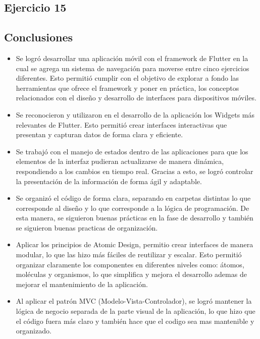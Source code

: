 \documentclass[12pt,letterpaper]{article}
\begin{document}
\subsection{Ejercicio 15}



\subsection{Conclusiones}

\begin{itemize}
    \item Se logró desarrollar una aplicación móvil con el framework de Flutter en la cual se agrega un sistema de navegación para moverse entre cinco ejercicios diferentes. Esto permitió cumplir con el objetivo de explorar a fondo las herramientas que ofrece el framework y poner en práctica, los conceptos relacionados con el diseño y desarrollo de interfaces para dispositivos móviles.
    \item Se reconocieron y utilizaron en el desarrollo de la aplicación los Widgets más relevantes de Flutter. Esto permitió crear interfaces interactivas que presentan y capturan datos de forma clara y eficiente.
    \item Se trabajó con el manejo de estados dentro de las aplicaciones para que los elementos de la interfaz pudieran actualizarse de manera dinámica, respondiendo a los cambios en tiempo real. Gracias a esto, se logró controlar la presentación de la información de forma ágil y adaptable.
    \item Se organizó el código de forma clara, separando en carpetas distintas lo que corresponde al diseño y lo que corresponde a la lógica de programación. De esta manera, se siguieron buenas prácticas en la fase de desarrollo y también se siguieron buenas practicas de organización.
    \item Aplicar los principios de Atomic Design, permitio crear interfaces de manera modular, lo que las hizo más fáciles de reutilizar y escalar. Esto permitió organizar claramente los componentes en diferentes niveles como: átomos, moléculas y organismos, lo que simplifica y mejora el desarrollo ademas de mejorar el mantenimiento de la aplicación.
    \item Al aplicar el patrón MVC (Modelo-Vista-Controlador), se logró mantener la lógica de negocio separada de la parte visual de la aplicación, lo que hizo que el código fuera más claro y también hace que el codigo sea mas mantenible y organizado.
\end{itemize}
\end{document}
